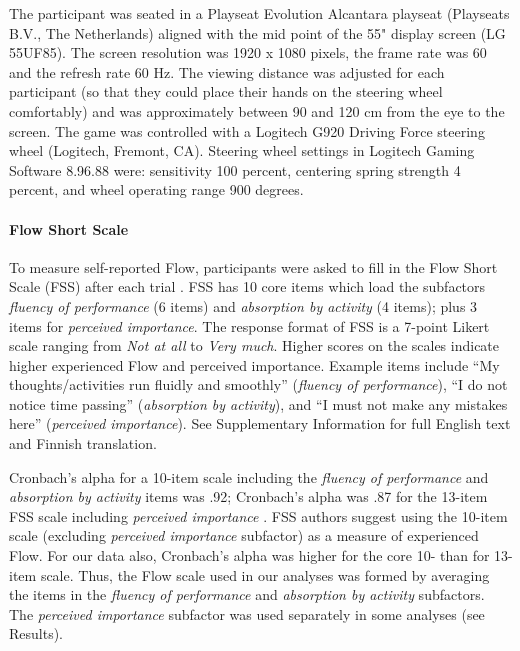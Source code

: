 \documentclass{frontierstyle/frontiersSCNS}
\begin{document}
The participant was seated in a Playseat Evolution Alcantara playseat (Playseats B.V., The Netherlands) aligned with the mid point of the 55" display screen (LG 55UF85). The screen resolution was 1920 x 1080 pixels, the frame rate was 60 and the refresh rate 60 Hz. The viewing distance was adjusted for each participant (so that they could place their hands on the steering wheel comfortably) and was approximately between 90 and 120 cm from the eye to the screen. The game was controlled with a Logitech G920 Driving Force steering wheel (Logitech, Fremont, CA). Steering wheel settings in Logitech Gaming Software 8.96.88 were: sensitivity 100 percent, centering spring strength 4 percent, and wheel operating range 900 degrees.


\paragraph*{Flow Short Scale} To measure self-reported Flow, participants were asked to fill in the Flow Short Scale (FSS) after each trial \citep{Rheinberg2003,Engeser2008}. FSS has 10 core items which load the subfactors {\it fluency of performance} (6 items) and {\it absorption by activity} (4 items); plus 3 items for {\it perceived importance}. The response format of FSS is a 7-point Likert scale ranging from {\it Not at all} to {\it Very much}. Higher scores on the scales indicate higher experienced Flow and perceived importance. Example items include ``My thoughts/activities run fluidly and smoothly'' ({\it fluency of performance}), ``I do not notice time passing'' ({\it absorption by activity}), and ``I must not make any mistakes here'' ({\it perceived importance}). See Supplementary Information for full English text and Finnish translation.

Cronbach's alpha for a 10-item scale including the {\it fluency of performance} and {\it absorption by activity} items was .92; Cronbach's alpha was .87 for the 13-item FSS scale including {\it perceived importance} \citep{Rheinberg2003}. FSS authors \citep{Rheinberg2003} suggest using the 10-item scale (excluding {\it perceived importance} subfactor) as a measure of experienced Flow. For our data also, Cronbach's alpha was higher for the core 10- than for 13-item scale. Thus, the Flow scale used in our analyses was formed by averaging the items in the {\it fluency of performance} and {\it absorption by activity} subfactors. The {\it perceived importance} subfactor was used separately in some analyses (see Results).
\end{document}
